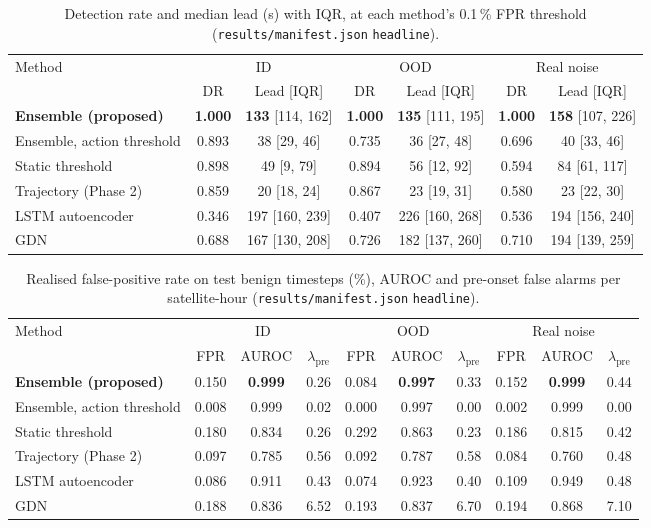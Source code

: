\documentclass[10pt,a4paper]{article}
\newcommand{\file}[1]{\texttt{#1}}
\begin{document}
\begin{table}[ht]
\centering
\caption{Detection rate and median lead (s) with IQR, at each method's 0.1\,\% FPR threshold
(\file{results/manifest.json} \texttt{headline}).}
\label{tab:recall-lead}
\small
\begin{tabular}{@{}lcccccc@{}}
\toprule
\multirow{2}{*}{Method} & \multicolumn{2}{c}{ID} & \multicolumn{2}{c}{OOD} & \multicolumn{2}{c}{Real noise} \\
\cmidrule(lr){2-3}\cmidrule(lr){4-5}\cmidrule(lr){6-7}
 & DR & Lead [IQR] & DR & Lead [IQR] & DR & Lead [IQR] \\
\midrule
\textbf{Ensemble (proposed)} & \textbf{1.000} & \textbf{133} [114, 162] & \textbf{1.000} & \textbf{135} [111, 195] & \textbf{1.000} & \textbf{158} [107, 226] \\
Ensemble, action threshold & 0.893 & 38 [29, 46] & 0.735 & 36 [27, 48] & 0.696 & 40 [33, 46] \\
Static threshold & 0.898 & 49 [9, 79] & 0.894 & 56 [12, 92] & 0.594 & 84 [61, 117] \\
Trajectory (Phase 2) & 0.859 & 20 [18, 24] & 0.867 & 23 [19, 31] & 0.580 & 23 [22, 30] \\
LSTM autoencoder & 0.346 & 197 [160, 239] & 0.407 & 226 [160, 268] & 0.536 & 194 [156, 240] \\
GDN & 0.688 & 167 [130, 208] & 0.726 & 182 [137, 260] & 0.710 & 194 [139, 259] \\
\bottomrule
\end{tabular}
\end{table}

\begin{table}[ht]
\centering
\caption{Realised false-positive rate on test benign timesteps (\%), AUROC and pre-onset false alarms
per satellite-hour (\file{results/manifest.json} \texttt{headline}).}
\label{tab:fpr-auroc}
\small
\begin{tabular}{@{}lccccccccc@{}}
\toprule
\multirow{2}{*}{Method} & \multicolumn{3}{c}{ID} & \multicolumn{3}{c}{OOD} & \multicolumn{3}{c}{Real noise} \\
\cmidrule(lr){2-4}\cmidrule(lr){5-7}\cmidrule(lr){8-10}
 & FPR & AUROC & $\lambda_{\mathrm{pre}}$ & FPR & AUROC & $\lambda_{\mathrm{pre}}$ & FPR & AUROC & $\lambda_{\mathrm{pre}}$ \\
\midrule
\textbf{Ensemble (proposed)} & 0.150 & \textbf{0.999} & 0.26 & 0.084 & \textbf{0.997} & 0.33 & 0.152 & \textbf{0.999} & 0.44 \\
Ensemble, action threshold & 0.008 & 0.999 & 0.02 & 0.000 & 0.997 & 0.00 & 0.002 & 0.999 & 0.00 \\
Static threshold & 0.180 & 0.834 & 0.26 & 0.292 & 0.863 & 0.23 & 0.186 & 0.815 & 0.42 \\
Trajectory (Phase 2) & 0.097 & 0.785 & 0.56 & 0.092 & 0.787 & 0.58 & 0.084 & 0.760 & 0.48 \\
LSTM autoencoder & 0.086 & 0.911 & 0.43 & 0.074 & 0.923 & 0.40 & 0.109 & 0.949 & 0.48 \\
GDN & 0.188 & 0.836 & 6.52 & 0.193 & 0.837 & 6.70 & 0.194 & 0.868 & 7.10 \\
\bottomrule
\end{tabular}
\end{table}
\end{document}
